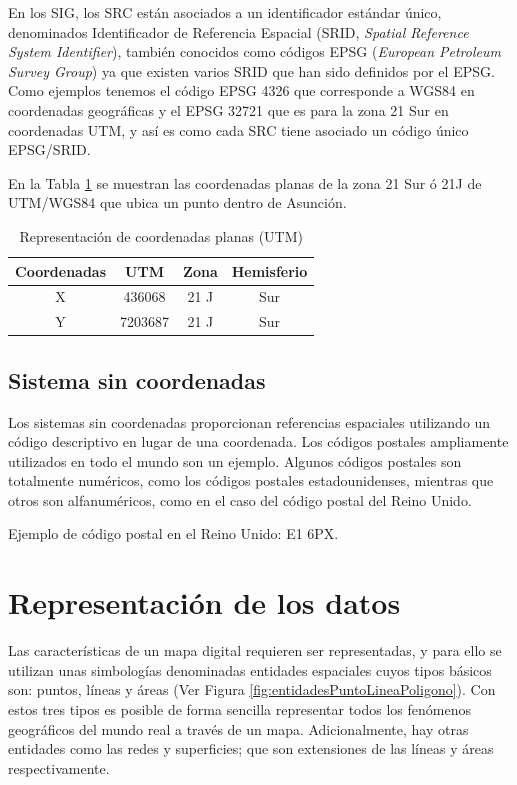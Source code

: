 En los SIG, los SRC están asociados a un identificador estándar único, denominados Identificador de Referencia Espacial (SRID, \textit{Spatial Reference System Identifier}), también conocidos como códigos EPSG (\textit{European Petroleum Survey Group}) ya que existen varios SRID que han sido definidos por el EPSG. Como ejemplos tenemos el código EPSG 4326 que corresponde a WGS84 en coordenadas geográficas y el EPSG 32721 que es para la zona 21 Sur en coordenadas UTM, y así es como cada SRC tiene asociado un código único EPSG/SRID.

En la Tabla \ref{table:coordenadasPlanas} se muestran las coordenadas planas de la zona 21 Sur ó 21J de UTM/WGS84 que ubica un punto dentro de Asunción.

\begin{table}[H]
\caption{Representación de coordenadas planas (UTM)}
\centering
\begin{tabular}{cccc}
\hline
Coordenadas & UTM     & Zona & Hemisferio \\ \hline
X           & 436068  & 21 J & Sur        \\
Y           & 7203687 & 21 J & Sur        \\ \hline
\end{tabular}
\label{table:coordenadasPlanas}
\end{table}

\subsection{Sistema sin coordenadas}
Los sistemas sin coordenadas proporcionan referencias espaciales utilizando un código descriptivo en lugar de una coordenada. Los códigos postales ampliamente utilizados en todo el mundo son un ejemplo. Algunos códigos postales son totalmente numéricos, como los códigos postales estadounidenses, mientras que otros son alfanuméricos, como en el caso del código postal del Reino Unido.

Ejemplo de código postal en el Reino Unido: E1 6PX.

\section{Representación de los datos}

Las características de un mapa digital requieren ser representadas, y para ello se utilizan unas simbologías denominadas entidades espaciales cuyos tipos básicos son: puntos, líneas y áreas (Ver Figura \ref{fig:entidadesPuntoLineaPoligono}). Con estos tres tipos es posible de forma sencilla representar todos los fenómenos geográficos del mundo real a través de un mapa. Adicionalmente, hay otras entidades como las redes y superficies; que son extensiones de las líneas y áreas respectivamente.

